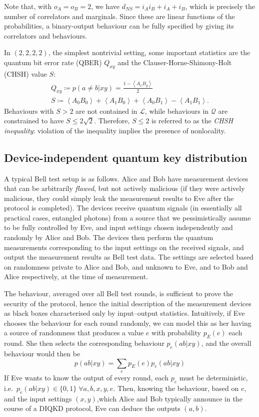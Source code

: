 \documentclass[10pt, a4paper]{article}
\numberwithin{equation}{section} %
\theoremstyle{definition}
\theoremstyle{plain}
\newcommand{\?}{\mathrel{?}} %
\newcommand{\angleb}[1]{\left\langle #1 \right\rangle} %
\newcommand{\Ls}{\mathcal{L}}
\newcommand{\Qs}{\mathcal{Q}}
\begin{document}
    Note that, with \(o_A = o_B = 2\), we have \(d_{NS} = {i_A}{i_B} + i_A + i_B\), which is precisely the number of correlators and marginals. Since these are linear functions of the probabilities, a binary-output behaviour can be fully specified by giving its correlators and behaviours.

    In \((2,2,2,2)\), the simplest nontrivial setting, some important statistics are the quantum bit error rate (QBER) \(Q_{xy}\) and the Clauser-Horne-Shimony-Holt (CHSH) value \(S\):
    \begin{gather}
      Q_{xy} \coloneqq p(a \neq b|xy) = \frac{1-\angleb{A_x B_y}}{2} \\
      S \coloneqq \angleb{A_0 B_0} + \angleb{A_1 B_0} + \angleb{A_0 B_1} - \angleb{A_1 B_1}.
    \end{gather}
    Behaviours with \(S > 2\) are not contained in \(\Ls\), while behaviours in \(\Qs\) are constrained to have \(S \leq 2\sqrt{2}\). Therefore, \(S \leq 2\) is referred to as the \emph{CHSH inequality}: violation of the inequality implies the presence of nonlocality.

    \subsection{Device-independent quantum key distribution}\label{sec:pre_diqkd}

    A typical Bell test setup is as follows. Alice and Bob have measurement devices that can be arbitrarily \emph{flawed}, but not actively malicious (if they were actively malicious, they could simply leak the measurement results to Eve after the protocol is completed). The devices receive quantum signals (in essentially all practical cases, entangled photons) from a source that we pessimistically assume to be fully controlled by Eve, and input settings chosen independently and randomly by Alice and Bob. The devices then perform the quantum measurements corresponding to the input settings on the received signals, and output the measurement results as Bell test data. The settings are selected based on randomness private to Alice and Bob, and unknown to Eve, and to Bob and Alice respectively, at the time of measurement.

    The behaviour, averaged over all Bell test rounds, is sufficient to prove the security of the protocol, hence the initial description of the measurement devices as black boxes characterised only by input--output statistics. Intuitively, if Eve chooses the behaviour for each round randomly, we can model this as her having a source of randomness that produces a value \(e\) with probability \(p_E(e)\) each round. She then selects the corresponding behaviour \(p_e(ab|xy)\), and the overall behaviour would then be
    \begin{equation}\label{eqn:finethm}
      p(ab|xy) = \sum_e p_E(e) p_e(ab|xy)
    \end{equation}
    If Eve wants to know the output of every round, each \(p_e\) must be deterministic, i.e.\ \(p_e(ab|xy) \in \{0, 1\}\;\forall a,b,x,y,e\). Then, knowing the behaviour, based on \(e\), and the input settings \((x,y)\),which Alice and Bob typically announce in the course of a DIQKD protocol, Eve can deduce the outputs \((a,b)\).
\end{document}

